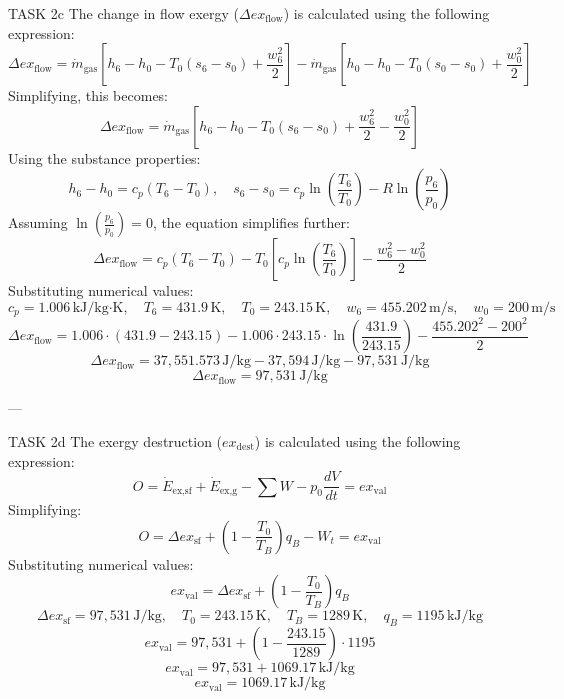 TASK 2c  
The change in flow exergy (\( \Delta ex_{\text{flow}} \)) is calculated using the following expression:  
\[
\Delta ex_{\text{flow}} = \dot{m}_{\text{gas}} \left[ h_6 - h_0 - T_0 (s_6 - s_0) + \frac{w_6^2}{2} \right] - \dot{m}_{\text{gas}} \left[ h_0 - h_0 - T_0 (s_0 - s_0) + \frac{w_0^2}{2} \right]
\]  
Simplifying, this becomes:  
\[
\Delta ex_{\text{flow}} = \dot{m}_{\text{gas}} \left[ h_6 - h_0 - T_0 (s_6 - s_0) + \frac{w_6^2}{2} - \frac{w_0^2}{2} \right]
\]  
Using the substance properties:  
\[
h_6 - h_0 = c_p (T_6 - T_0), \quad s_6 - s_0 = c_p \ln \left( \frac{T_6}{T_0} \right) - R \ln \left( \frac{p_6}{p_0} \right)
\]  
Assuming \( \ln \left( \frac{p_6}{p_0} \right) = 0 \), the equation simplifies further:  
\[
\Delta ex_{\text{flow}} = c_p (T_6 - T_0) - T_0 \left[ c_p \ln \left( \frac{T_6}{T_0} \right) \right] - \frac{w_6^2 - w_0^2}{2}
\]  
Substituting numerical values:  
\[
c_p = 1.006 \, \text{kJ/kg·K}, \quad T_6 = 431.9 \, \text{K}, \quad T_0 = 243.15 \, \text{K}, \quad w_6 = 455.202 \, \text{m/s}, \quad w_0 = 200 \, \text{m/s}
\]  
\[
\Delta ex_{\text{flow}} = 1.006 \cdot (431.9 - 243.15) - 1.006 \cdot 243.15 \cdot \ln \left( \frac{431.9}{243.15} \right) - \frac{455.202^2 - 200^2}{2}
\]  
\[
\Delta ex_{\text{flow}} = 37,551.573 \, \text{J/kg} - 37,594 \, \text{J/kg} - 97,531 \, \text{J/kg}
\]  
\[
\Delta ex_{\text{flow}} = 97,531 \, \text{J/kg}
\]  

---

TASK 2d  
The exergy destruction (\( ex_{\text{dest}} \)) is calculated using the following expression:  
\[
O = \dot{E}_{\text{ex,sf}} + \dot{E}_{\text{ex,g}} - \sum W - p_0 \frac{dV}{dt} = ex_{\text{val}}
\]  
Simplifying:  
\[
O = \Delta ex_{\text{sf}} + (1 - \frac{T_0}{T_B}) q_B - W_t = ex_{\text{val}}
\]  
Substituting numerical values:  
\[
ex_{\text{val}} = \Delta ex_{\text{sf}} + (1 - \frac{T_0}{T_B}) q_B
\]  
\[
\Delta ex_{\text{sf}} = 97,531 \, \text{J/kg}, \quad T_0 = 243.15 \, \text{K}, \quad T_B = 1289 \, \text{K}, \quad q_B = 1195 \, \text{kJ/kg}
\]  
\[
ex_{\text{val}} = 97,531 + (1 - \frac{243.15}{1289}) \cdot 1195
\]  
\[
ex_{\text{val}} = 97,531 + 1069.17 \, \text{kJ/kg}
\]  
\[
ex_{\text{val}} = 1069.17 \, \text{kJ/kg}
\]